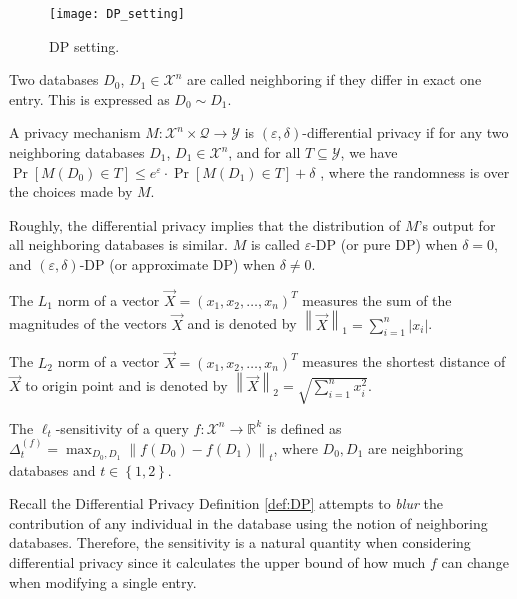 \begin{figure}[htbp]
    \texttt{[image: DP\_setting]}
    \centering
    \caption{DP setting.}
    \label{img:DPsetting}
\end{figure}
\FloatBarrier

\begin{definition}
    Two databases $D_{0}$, $D_{1}\in \mathcal{X}^{n}$  are called neighboring if they differ in exact one entry. This is expressed as $D_{0}\sim D_{1}$.
\end{definition}

\begin{definition}
    A privacy mechanism $M:\mathcal{X}^{n}\times \mathcal{Q}\rightarrow \mathcal{Y}$ is $\left( \varepsilon ,\delta \right)$-differential privacy if for any two neighboring databases $D_{1}$, $D_{1}\in \mathcal{X}^{n}$, and for all $T\subseteq \mathcal{Y}$, we have $\Pr \left[ M\left( D_{0}\right) \in T\right] \leq e^{\varepsilon}\cdot \Pr \left[ M\left( D_{1}\right) \in T\right] +\delta$ ,
    where the randomness is over the choices made by $M$.
    \label{def:DP}
\end{definition}

Roughly, the differential privacy implies that the distribution of $M$'s output for all neighboring databases is similar. $M$ is called $\varepsilon$-DP (or pure DP) when $\delta = 0$, and $\left(\varepsilon,\delta\right)$-DP (or approximate DP) when $\delta \neq 0$.

\begin{definition}[$L_{1}$ norm]
    The $L_{1}$ norm of a vector $\vec{X}=\left(x_1, x_2, \ldots,x_n \right)^{T}$ measures the sum of the magnitudes of the vectors $\vec{X}$ and is denoted by $\left\|\vec{X}\right\|_{1}=\sum ^{n}_{i=1}\left| x_{i}\right| $.
\end{definition}

\begin{definition}[$L_{2}$ norm]
    The $L_{2}$ norm of a vector $\vec{X}=\left(x_1, x_2, \ldots,x_n \right)^{T}$ measures the shortest distance of $\vec{X}$ to origin point and is denoted by $\left\|\vec{X}\right\|_{2}=\sqrt{\sum ^{n}_{i=1}x_{i}^{2}}$.
\end{definition}

\begin{definition}
    The $\ell_{t}$-sensitivity of a query $f : \mathcal{X}^{n} \rightarrow \mathbb{R}^{k}$ is deﬁned as $\Delta ^{\left(f\right)}_{t}=\max _{D_{0},D_{1}} \left\| f\left( D_{0}\right) -f\left( D_{1}\right) \right\| _{t}$, where $D_{0},D_{1}$ are neighboring databases and $t \in \left\{1,2\right\}$.
    \label{def:sensitivity}
\end{definition}
Recall the Differential Privacy Definition \autoref{def:DP} attempts to \textit{blur} the contribution of any individual in the database using the notion of neighboring databases. Therefore, the sensitivity is a natural quantity when considering differential privacy since it calculates the upper bound of how much $f$ can change when modifying a single entry.


